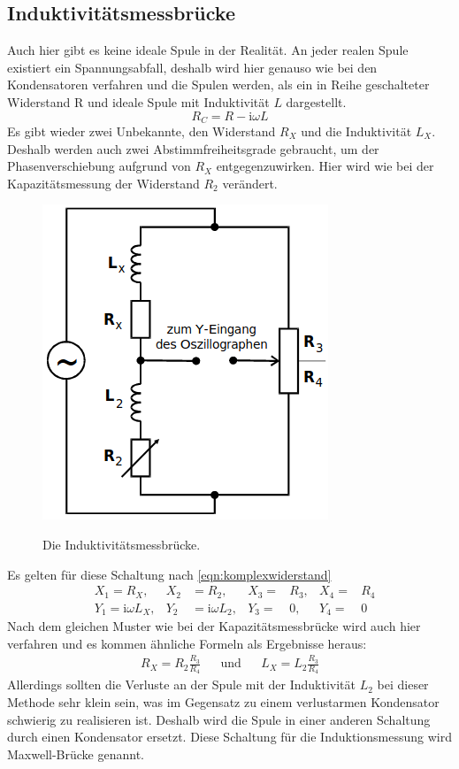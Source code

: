 \documentclass[titlepage = firstcover]{scrartcl}
\begin{document}
          \subsection{Induktivitätsmessbrücke}
          Auch hier gibt es keine ideale Spule in der Realität. An jeder realen Spule existiert ein Spannungsabfall, deshalb wird hier genauso wie bei den
          Kondensatoren verfahren und die Spulen werden, als ein in Reihe geschalteter Widerstand R und ideale Spule mit Induktivität $L$ dargestellt. 
          \begin{equation}
            R_C = R - \text{i} \omega L
          \end{equation}
          Es gibt wieder zwei Unbekannte, den Widerstand $R_X$ und die Induktivität $L_X$. Deshalb werden auch zwei Abstimmfreiheitsgrade gebraucht, um der
          Phasenverschiebung aufgrund von $R_X$ entgegenzuwirken. Hier wird wie bei der Kapazitätsmessung der Widerstand $R_2$ verändert.
          \begin{figure}[h]
            \centering
            \caption{Die Induktivitätsmessbrücke.}
            \includegraphics[width = 0.4\linewidth]{Induktivitaetsmessbruecke.png}
            \label{fig:wheatstone}
          \end{figure}
          Es gelten für diese Schaltung nach \eqref{eqn:komplexwiderstand}
          \begin{align*}
            &X_1 = R_X, & X_2 &= R_2, & X_3 =& R_3, & X_4 =& R_4 \\
            &Y_1 = \text{i} \omega L_X, & Y_2 &= \text{i} \omega L_2, & Y_3 =& 0, & Y_4 =& 0
          \end{align*}
          Nach dem gleichen Muster wie bei der Kapazitätsmessbrücke wird auch hier verfahren und es kommen ähnliche Formeln als Ergebnisse heraus:
          \begin{align}
            R_X = R_2 \frac{R_3}{R_4} &&\text{und}&& L_X = L_2 \frac{R_3}{R_4}            
          \end{align}
          Allerdings sollten die Verluste an der Spule mit der Induktivität $L_2$ bei dieser Methode sehr klein sein, was im Gegensatz zu einem verlustarmen
          Kondensator schwierig zu realisieren ist. Deshalb wird die Spule in einer anderen Schaltung durch einen Kondensator ersetzt. Diese Schaltung für die
          Induktionsmessung wird Maxwell-Brücke genannt.
        \FloatBarrier
\end{document}
